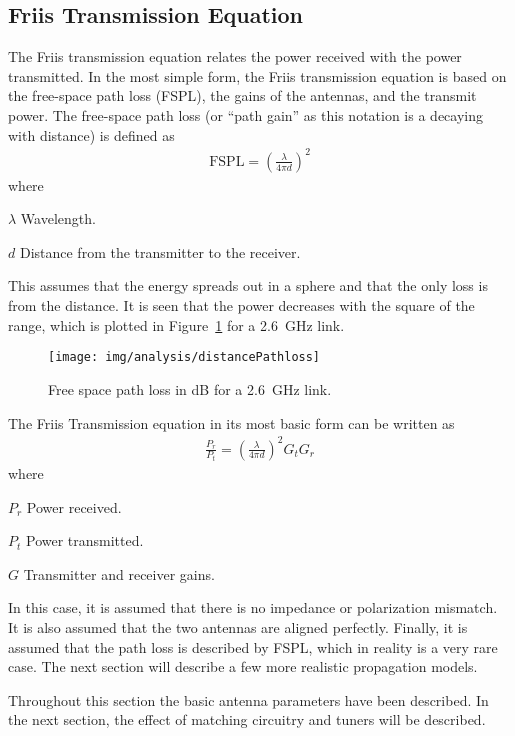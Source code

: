 \subsection{Friis Transmission Equation}
The Friis transmission equation relates the power received with the power transmitted. In the most simple form, the Friis transmission equation is based on the free-space path loss (FSPL), the gains of the antennas, and the transmit power. The free-space path loss (or ``path gain'' as this notation is a decaying with distance) is defined as \cite{balanis2012antenna}
\begin{align} %
  \label{eq:fspl}
  \text{FSPL} = \left( \frac{\lambda}{4 \pi d} \right)^2 
\end{align}
where
\begin{where}
\item[$\lambda$] Wavelength.
\item[$d$] Distance from the transmitter to the receiver.
\end{where}
This assumes that the energy spreads out in a sphere and that the only loss is from the distance. It is seen that the power decreases with the square of the range, which is plotted in Figure~\ref{fig:fspl-plot} for a \SI{2.6}{GHz} link.

\begin{figure}[htbp]
  \centering
  \texttt{[image: img/analysis/distancePathloss]}
  \caption{Free space path loss in dB for a \SI{2.6}{GHz} link.}
  \label{fig:fspl-plot}
\end{figure}

The Friis Transmission equation in its most basic form can be written as \cite{balanis2012antenna} 
\begin{align}%
    \frac{P_r}{P_t} = \left( \frac{\lambda}{4 \pi d} \right)^2 G_{t} G_{r} 
\end{align}
where
\begin{where} 
\item[$P_r$] Power received.
\item[$P_t$] Power transmitted.
\item[$G$] Transmitter and receiver gains.
\end{where}
In this case, it is assumed that there is no impedance or polarization mismatch. It is also assumed that the two antennas are aligned perfectly. Finally, it is assumed that the path loss is described by FSPL, which in reality is a very rare case. The next section will describe a few more realistic propagation models.


\begin{aautail}
Throughout this section the basic antenna parameters have been described. In the next section, the effect of matching circuitry and tuners will be described.
\end{aautail}
